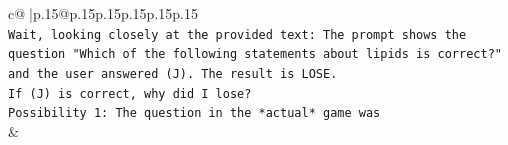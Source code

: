 \documentclass{article}
\begin{document}
{\begin{supertabular}{c@{$\;$}|p{.15\linewidth}@{}p{.15\linewidth}p{.15\linewidth}p{.15\linewidth}p{.15\linewidth}p{.15\linewidth}}
{{{\\ 
\texttt{Wait, looking closely at the provided text: The prompt shows the question "Which of the following statements about lipids is correct?" and the user answered (J). The result is LOSE.} \\
\texttt{If (J) is correct, why did I lose?} \\
\texttt{Possibility 1: The question in the *actual* game was} \\
            }
        }
    }
    & \\ \\

\end{supertabular}
}
\end{document}
